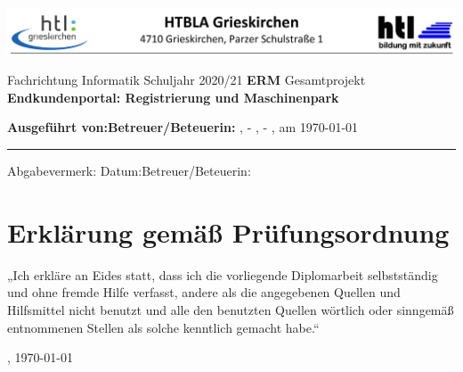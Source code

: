 \newcommand{\IncludeSchoolTemplate}[2]{
	\vspace*{-7em}
	\makebox[\textwidth]{
		\begin{tikzpicture}[
			every node/.style={anchor=north west,inner sep=0pt},
			x=1mm, y=1mm]
			\node (templatepage) at (0,0)
			{\texttt{[image: ./summary.pdf]}};
			#2
		\end{tikzpicture}
	}
	\newpage
}


\includegraphics[width=\textwidth]{./grafiken/school-header.png}
{\centering
	\vskip1cm
	Fachrichtung Informatik
	\vskip2cm
	Schuljahr 2020/21
	\vskip4cm
	\Huge\textbf{ERM}
	\vskip10pt
	\large
	Gesamtprojekt
	\vskip5pt
	\Huge\textbf{Endkundenportal: Registrierung und Maschinenpark}
	\small
	\vskip4cm
	\begin{flushleft}
		\textbf{Ausgeführt von:}\tabto{9cm}\textbf{Betreuer/Beteuerin:}\linebreak
		\ThRealAuthorNameOne, \ThAuthorsClass-\ThAuthorOneNumber\tabto{9cm}\ThSupervisorName\linebreak
		\ThRealAuthorNameTwo, \ThAuthorsClass-\ThAuthorTwoNumber
		\vskip0.5cm
		\ThPhysicalLocation, am \today
		\hrule
		Abgabevermerk:\linebreak
		Datum:\tabto{6.5cm}Betreuer/Beteuerin: \ThSupervisorName
	\end{flushleft}
}



\chapter*{\hspace{5pt}Erklärung gemäß Prüfungsordnung}
„Ich erkläre an Eides statt, dass ich die vorliegende Diplomarbeit selbstständig und ohne fremde Hilfe verfasst, andere als die angegebenen Quellen und Hilfsmittel nicht benutzt und alle den benutzten Quellen wörtlich oder sinngemäß entnommenen Stellen als solche kenntlich gemacht habe.“

\ThPhysicalLocation, \today{}

